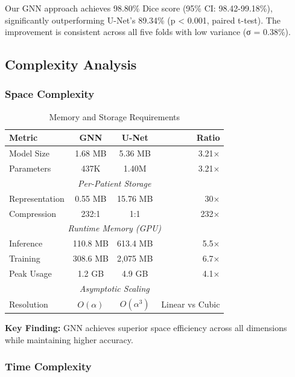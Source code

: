 \documentclass[conference]{IEEEtran}
\begin{document}
Our GNN approach achieves 98.80\% Dice score (95\% CI: 98.42-99.18\%), significantly outperforming U-Net's 89.34\% (p < 0.001, paired t-test). The improvement is consistent across all five folds with low variance (σ = 0.38\%).

\subsection{Complexity Analysis}

\subsubsection{Space Complexity}

\begin{table}[h]
\centering
\caption{Memory and Storage Requirements}
\label{tab:space}
\begin{tabular}{lccr}
\toprule
\textbf{Metric} & \textbf{GNN} & \textbf{U-Net} & \textbf{Ratio} \\
\midrule
Model Size & 1.68 MB & 5.36 MB & 3.21× \\
Parameters & 437K & 1.40M & 3.21× \\
\midrule
\multicolumn{4}{c}{\textit{Per-Patient Storage}} \\
\midrule
Representation & 0.55 MB & 15.76 MB & 30× \\
Compression & 232:1 & 1:1 & 232× \\
\midrule
\multicolumn{4}{c}{\textit{Runtime Memory (GPU)}} \\
\midrule
Inference & 110.8 MB & 613.4 MB & 5.5× \\
Training & 308.6 MB & 2,075 MB & 6.7× \\
Peak Usage & 1.2 GB & 4.9 GB & 4.1× \\
\midrule
\multicolumn{4}{c}{\textit{Asymptotic Scaling}} \\
\midrule
Resolution & $O(\alpha)$ & $O(\alpha^3)$ & Linear vs Cubic \\
\bottomrule
\end{tabular}
\end{table}

\textbf{Key Finding:} GNN achieves superior space efficiency across all dimensions while maintaining higher accuracy.

\subsubsection{Time Complexity}
\end{document}
